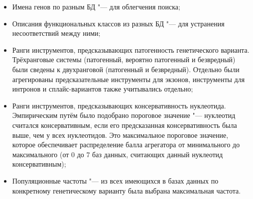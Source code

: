 \documentclass[12pt, twoside, a4paper]{article}
\begin{document}
\begin{itemize}
	\item Имена генов по разным БД "--- для облегчения поиска;
	\item Описания функциональных классов из разных БД "--- для устранения несоответствий между ними;
	\item Ранги инструментов, предсказывающих патогенность генетического варианта.
	      Трёхранговые системы (патогенный, вероятно патогенный и безвредный) были сведены к двухранговой (патогенный и безвредный).
	      Отдельно были агрегированы предсказательные инструменты для экзонов, инструменты для интронов и сплайс-вариантов также учитывались отдельно;
	\item Ранги инструментов, предсказывающих консервативность нуклеотида.
	      Эмпирическим путём было подобрано пороговое значение  "--- нуклеотид считался консервативным, если его предсказанная консервативность была выше, чем у  всех нуклеотидов.
	      Это максимальное пороговое значение, которое обеспечивает распределение балла агрегатора от минимального до максимального (от 0 до 7 баз данных, считающих данный нуклеотид консервативным);
	\item Популяционные частоты "--- из всех имеющихся в базах данных по конкретному генетическому варианту была выбрана максимальная частота.
\end{itemize}
\end{document}
